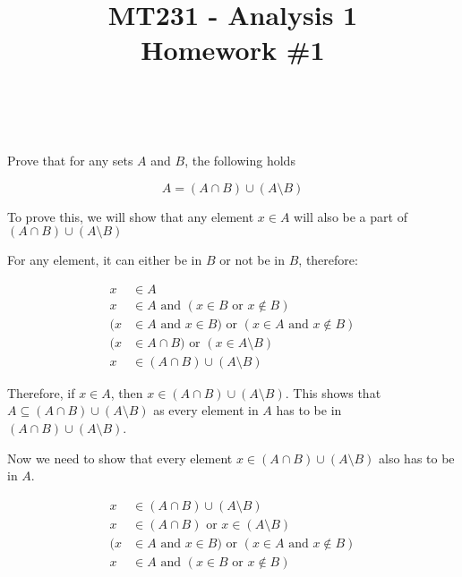 \documentclass[12pt]{article} %
\title{
    \vspace{2in}
        \textmd{\textbf{MT231 - Analysis 1}}\\
    \vspace{1in}
    \textmd{\textbf{Homework \#1}}\\
    \vspace{1in}
}
\author{
    \hmwkAuthorName\\
    \hmwkStudentnum
}
\date{}
\begin{document}
\maketitle

\pagebreak

\begin{homeworkProblem}

    \begin{grayBoxed}
        Prove that for any sets $A$ and $B$, the following holds

        $$
            A = (A \cap B) \cup (A \setminus B)
        $$
    \end{grayBoxed}

    To prove this, we will show that any element $x \in A$ will also be a part of $(A \cap B) \cup (A \setminus B)$

    For any element, it can either be in $B$ or not be in $B$, therefore:

    \begin{align*}
        x  & \in A                                                                       \\
        x  & \in A \text{ and } (x \in B \text{ or } x \not \in B)                       \\
        (x & \in A \text{ and } x \in B) \text{ or } (x \in A \text{ and } x \not \in B) \\
        (x & \in A \cap B) \text{ or } (x \in A \setminus B)                             \\
        x  & \in (A \cap B)\cup (A \setminus B)
    \end{align*}

    Therefore, if $x \in A$, then $x \in (A \cap B)\cup (A \setminus B)$.
    This shows that $A \subseteq (A \cap B)\cup (A \setminus B)$ as every element in $A$ has to be in $(A \cap B)\cup (A \setminus B)$.

    Now we need to show that every element $x \in (A \cap B)\cup (A \setminus B)$ also has to be in $A$.

    \begin{align*}
        x  & \in (A \cap B)\cup (A \setminus B)                                          \\
        x  & \in (A \cap B) \text{ or } x   \in (A \setminus B)                          \\
        (x & \in A \text{ and } x \in B) \text{ or } (x \in A \text{ and } x \not \in B) \\
        x  & \in A \text{ and } (x \in B \text{ or } x \not \in B)                       \\
    \end{align*}


\end{homeworkProblem}
\end{document}
